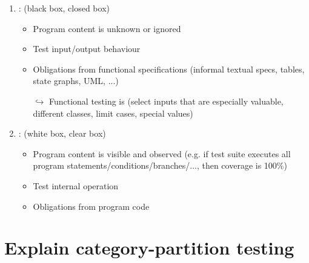 \begin{enumerate}
    \item {} : (black box, closed box)
    \begin{itemize}
        \item Program content is unknown or ignored
        \item Test input/output behaviour
        \item Obligations from functional specifications (informal textual specs, tables, state graphs, UML, ...)
        \item [$\hookrightarrow$] Functional testing is  (select inputs that are especially valuable, different classes, limit cases, special values)
    \end{itemize}
    \item {} : (white box, clear box)
    \begin{itemize}
         \item Program content is visible and observed (e.g. if test suite executes all program statements/conditions/branches/..., then coverage is 100\%)
         \item Test internal operation
         \item Obligations from program code
     \end{itemize}
\end{enumerate}

\newpage
\section{Explain category-partition testing}


